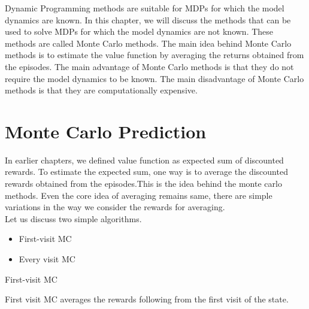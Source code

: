 \documentclass[../main.tex]{subfiles}
\begin{document}
Dynamic Programming methods are suitable for MDPs for which the model dynamics are known. In this chapter, we will discuss the methods that can be used to solve MDPs for which the model dynamics are not known. These methods are called Monte Carlo methods. The main idea behind Monte Carlo methods is to estimate the value function by averaging the returns obtained from the episodes. The main advantage of Monte Carlo methods is that they do not require the model dynamics to be known. The main disadvantage of Monte Carlo methods is that they are computationally expensive. 

\section{Monte Carlo Prediction}
In earlier chapters, we defined value function as expected sum of discounted rewards. To estimate the expected sum, one way is to average the discounted rewards obtained from the episodes.This is the idea behind the monte carlo methods. Even the core idea of averaging remains same, there are simple variations in the way we consider the rewards for averaging.
\\
Let us discuss two simple algorithms.
\begin{itemize}
    \item First-visit MC
    \item Every visit MC
\end{itemize}

\begin{algorithm}[H]
\caption{First-visit MC}
\label{alg:first-visit}
\end{algorithm}

First visit MC  averages  the rewards following from the first visit of the state. 
\end{document}
